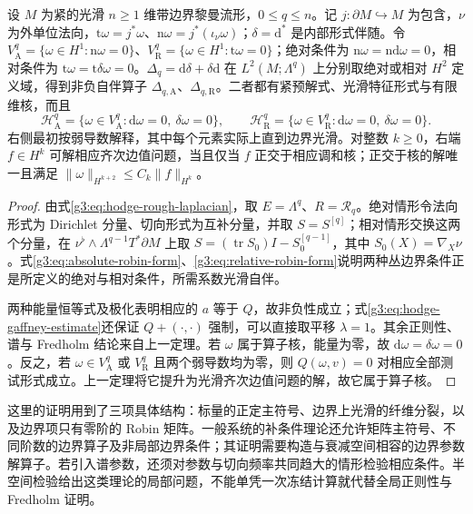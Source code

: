\begin{corollary}\label{g3:cor:hodge-boundary-fredholm}
	设 \(M\) 为紧的光滑 \(n\ge1\) 维带边界黎曼流形，\(0\le q\le n\)。记 \(j:\partial M\hookrightarrow M\) 为包含，\(\nu\) 为外单位法向，\(\mathrm t\omega=j^*\omega\)、\(\mathrm n\omega=j^*(\iota_\nu\omega)\)；\(\delta=\mathrm d^*\) 是内部形式伴随。令 \(V_{\mathrm A}^q=\{\omega\in H^1:\mathrm n\omega=0\}\)、\(V_{\mathrm R}^q=\{\omega\in H^1:\mathrm t\omega=0\}\)；绝对条件为 \(\mathrm n\omega=\mathrm n\mathrm d\omega=0\)，相对条件为 \(\mathrm t\omega=\mathrm t\delta\omega=0\)。\(\Delta_q=\mathrm d\delta+\delta\mathrm d\) 在 \(L^2(M;\Lambda^q)\) 上分别取绝对或相对 \(H^2\) 定义域，得到非负自伴算子 \(\Delta_{q,\mathrm A}\)、\(\Delta_{q,\mathrm R}\)。二者都有紧预解式、光滑特征形式与有限维核，而且
	\[
		\mathcal H_{\mathrm A}^q
		=\{\omega\in V_{\mathrm A}^q:\mathrm d\omega=0,\ \delta\omega=0\},
		\qquad
		\mathcal H_{\mathrm R}^q
		=\{\omega\in V_{\mathrm R}^q:\mathrm d\omega=0,\ \delta\omega=0\}.
	\]
	右侧最初按弱导数解释，其中每个元素实际上直到边界光滑。对整数 \(k\ge0\)，右端 \(f\in H^k\) 可解相应齐次边值问题，当且仅当 \(f\) 正交于相应调和核；正交于核的解唯一且满足 \(\|\omega\|_{H^{k+2}}\le C_k\|f\|_{H^k}\)。
\end{corollary}
\begin{proof}
	由式\eqref{g3:eq:hodge-rough-laplacian}，取 \(E=\Lambda^q\)、\(R=\mathcal R_q\)。绝对情形令法向形式为 Dirichlet 分量、切向形式为互补分量，并取 \(S=S^{[q]}\)；相对情形交换这两个分量，在 \(\nu^\flat\wedge\Lambda^{q-1}T^*\partial M\) 上取 \(S=(\operatorname{tr}S_0)I-S_0^{[q-1]}\)，其中 \(S_0(X)=\nabla_X\nu\)。式\eqref{g3:eq:absolute-robin-form}、\eqref{g3:eq:relative-robin-form}说明两种丛边界条件正是所定义的绝对与相对条件，所需系数光滑自伴。

	两种能量恒等式及极化表明相应的 \(a\) 等于 \(Q\)，故非负性成立；式\eqref{g3:eq:hodge-gaffney-estimate}还保证 \(Q+(\cdot,\cdot)\) 强制，可以直接取平移 \(\lambda=1\)。其余正则性、谱与 Fredholm 结论来自上一定理。若 \(\omega\) 属于算子核，能量为零，故 \(\mathrm d\omega=\delta\omega=0\)。反之，若 \(\omega\in V_{\mathrm A}^q\) 或 \(V_{\mathrm R}^q\) 且两个弱导数均为零，则 \(Q(\omega,v)=0\) 对相应全部测试形式成立。上一定理将它提升为光滑齐次边值问题的解，故它属于算子核。
\end{proof}

这里的证明用到了三项具体结构：标量的正定主符号、边界上光滑的纤维分裂，以及边界项只有零阶的 Robin 矩阵。一般系统的补条件理论还允许矩阵主符号、不同阶数的边界算子及非局部边界条件；其证明需要构造与衰减空间相容的边界参数解算子。若引入谱参数，还须对参数与切向频率共同趋大的情形检验相应条件。半空间检验给出这类理论的局部问题，不能单凭一次冻结计算就代替全局正则性与 Fredholm 证明。
